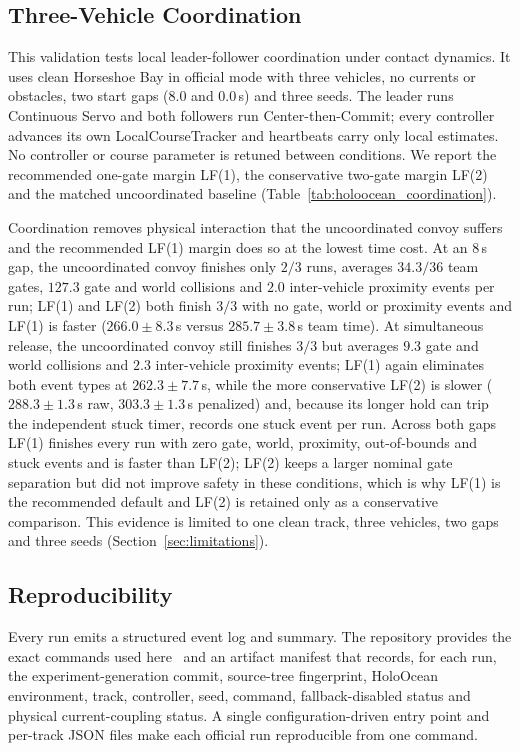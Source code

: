 \subsection{Three-Vehicle Coordination}
\label{sec:eval_holoocean_coord}



This validation tests local leader-follower coordination under contact dynamics. It uses clean Horseshoe Bay in official mode with three vehicles, no currents or obstacles, two start gaps ($8.0$ and $0.0$\,s) and three seeds. The leader runs Continuous Servo and both followers run Center-then-Commit; every controller advances its own LocalCourseTracker and heartbeats carry only local estimates. No controller or course parameter is retuned between conditions. We report the recommended one-gate margin LF(1), the conservative two-gate margin LF(2) and the matched uncoordinated baseline (Table~\ref{tab:holoocean_coordination}).

Coordination removes physical interaction that the uncoordinated convoy suffers and the recommended LF(1) margin does so at the lowest time cost. At an $8$\,s gap, the uncoordinated convoy finishes only $2/3$ runs, averages $34.3/36$ team gates, $127.3$ gate and world collisions and $2.0$ inter-vehicle proximity events per run; LF(1) and LF(2) both finish $3/3$ with no gate, world or proximity events and LF(1) is faster ($266.0\pm8.3$\,s versus $285.7\pm3.8$\,s team time). At simultaneous release, the uncoordinated convoy still finishes $3/3$ but averages $9.3$ gate and world collisions and $2.3$ inter-vehicle proximity events; LF(1) again eliminates both event types at $262.3\pm7.7$\,s, while the more conservative LF(2) is slower ($288.3\pm1.3$\,s raw, $303.3\pm1.3$\,s penalized) and, because its longer hold can trip the independent stuck timer, records one stuck event per run. Across both gaps LF(1) finishes every run with zero gate, world, proximity, out-of-bounds and stuck events and is faster than LF(2); LF(2) keeps a larger nominal gate separation but did not improve safety in these conditions, which is why LF(1) is the recommended default and LF(2) is retained only as a conservative comparison. This evidence is limited to one clean track, three vehicles, two gaps and three seeds (Section~\ref{sec:limitations}).

\subsection{Reproducibility}
\label{sec:reproducibility}

Every run emits a structured event log and summary. The repository provides the exact commands used here~\cite{holodronecompetition2026} and an artifact manifest that records, for each run, the experiment-generation commit, source-tree fingerprint, HoloOcean environment, track, controller, seed, command, fallback-disabled status and physical current-coupling status. A single configuration-driven entry point and per-track JSON files make each official run reproducible from one command.
